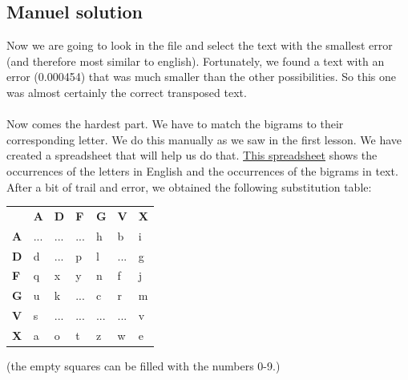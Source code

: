 \documentclass{article}
\begin{document}
\subsection{Manuel solution}
Now we are going to look in the file and select the text with the smallest error (and therefore most similar to english). Fortunately, we found a text with an error (0.000454) that was much smaller than the other possibilities. So this one was almost certainly the correct transposed text.\\
\\
Now comes the hardest part. We have to match the bigrams to their corresponding letter. We do this manually as we saw in the first lesson. We have created a spreadsheet that will help us do that. \hyperlink{https://docs.google.com/spreadsheets/d/18L9Xed-bFH-7W2jY9kgeEXixlJdJMib6p8IxcVjUxeQ/edit?usp=sharing}{This spreadsheet} shows the occurrences of the letters in English and the occurrences of the bigrams in text. After a bit of trail and error, we obtained the following substitution table:
\begin{table}[H]
\begin{tabular}{lllllll}
\textbf{} &
  \textbf{A} &
  \textbf{D} &
  \textbf{F} &
  \textbf{G} &
  \textbf{V} &
  \textbf{X} \\ \cline{2-7}
\multicolumn{1}{l|}{\textbf{A}} &
  \multicolumn{1}{l|}{...} &
  \multicolumn{1}{l|}{...} &
  \multicolumn{1}{l|}{...} &
  \multicolumn{1}{l|}{h} &
  \multicolumn{1}{l|}{b} &
  \multicolumn{1}{l|}{i} \\ \cline{2-7}
\multicolumn{1}{l|}{\textbf{D}} &
  \multicolumn{1}{l|}{d} &
  \multicolumn{1}{l|}{...} &
  \multicolumn{1}{l|}{p} &
  \multicolumn{1}{l|}{l} &
  \multicolumn{1}{l|}{...} &
  \multicolumn{1}{l|}{g} \\ \cline{2-7}
\multicolumn{1}{l|}{\textbf{F}} &
  \multicolumn{1}{l|}{q} &
  \multicolumn{1}{l|}{x} &
  \multicolumn{1}{l|}{y} &
  \multicolumn{1}{l|}{n} &
  \multicolumn{1}{l|}{f} &
  \multicolumn{1}{l|}{j} \\ \cline{2-7}
\multicolumn{1}{l|}{\textbf{G}} &
  \multicolumn{1}{l|}{u} &
  \multicolumn{1}{l|}{k} &
  \multicolumn{1}{l|}{...} &
  \multicolumn{1}{l|}{c} &
  \multicolumn{1}{l|}{r} &
  \multicolumn{1}{l|}{m} \\ \cline{2-7}
\multicolumn{1}{l|}{\textbf{V}} &
  \multicolumn{1}{l|}{s} &
  \multicolumn{1}{l|}{...} &
  \multicolumn{1}{l|}{...} &
  \multicolumn{1}{l|}{...} &
  \multicolumn{1}{l|}{...} &
  \multicolumn{1}{l|}{v} \\ \cline{2-7}
\multicolumn{1}{l|}{\textbf{X}} &
  \multicolumn{1}{l|}{a} &
  \multicolumn{1}{l|}{o} &
  \multicolumn{1}{l|}{t} &
  \multicolumn{1}{l|}{z} &
  \multicolumn{1}{l|}{w} &
  \multicolumn{1}{l|}{e} \\ \cline{2-7}
\end{tabular}
\end{table}
(the empty squares can be filled with the numbers 0-9.)
\end{document}
